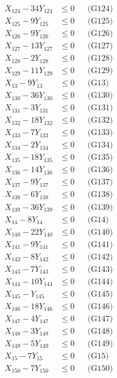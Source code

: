 \documentclass[a4paper,10pt]{article}
\begin{document}
{\begin{align}
X_{124} - 34Y_{124} &\leq 0 && \text{(G124)} \\
X_{125} - 9Y_{125} &\leq 0 && \text{(G125)} \\
X_{126} - 9Y_{126} &\leq 0 && \text{(G126)} \\
X_{127} - 13Y_{127} &\leq 0 && \text{(G127)} \\
X_{128} - 2Y_{128} &\leq 0 && \text{(G128)} \\
X_{129} - 11Y_{129} &\leq 0 && \text{(G129)} \\
X_{13} - 9Y_{13} &\leq 0 && \text{(G13)} \\
X_{130} - 36Y_{130} &\leq 0 && \text{(G130)} \\
X_{131} - 3Y_{131} &\leq 0 && \text{(G131)} \\
X_{132} - 18Y_{132} &\leq 0 && \text{(G132)} \\
X_{133} - 7Y_{133} &\leq 0 && \text{(G133)} \\
\allowbreak
X_{134} - 2Y_{134} &\leq 0 && \text{(G134)} \\
X_{135} - 18Y_{135} &\leq 0 && \text{(G135)} \\
X_{136} - 14Y_{136} &\leq 0 && \text{(G136)} \\
X_{137} - 9Y_{137} &\leq 0 && \text{(G137)} \\
X_{138} - 6Y_{138} &\leq 0 && \text{(G138)} \\
X_{139} - 36Y_{139} &\leq 0 && \text{(G139)} \\
X_{14} - 8Y_{14} &\leq 0 && \text{(G14)} \\
X_{140} - 22Y_{140} &\leq 0 && \text{(G140)} \\
X_{141} - 9Y_{141} &\leq 0 && \text{(G141)} \\
X_{142} - 8Y_{142} &\leq 0 && \text{(G142)} \\
X_{143} - 7Y_{143} &\leq 0 && \text{(G143)} \\
X_{144} - 10Y_{144} &\leq 0 && \text{(G144)} \\
X_{145} - Y_{145} &\leq 0 && \text{(G145)} \\
X_{146} - 18Y_{146} &\leq 0 && \text{(G146)} \\
X_{147} - 4Y_{147} &\leq 0 && \text{(G147)} \\
X_{148} - 3Y_{148} &\leq 0 && \text{(G148)} \\
X_{149} - 5Y_{149} &\leq 0 && \text{(G149)} \\
X_{15} - 7Y_{15} &\leq 0 && \text{(G15)} \\
X_{150} - 7Y_{150} &\leq 0 && \text{(G150)} \\

\end{align}}
\end{document}
